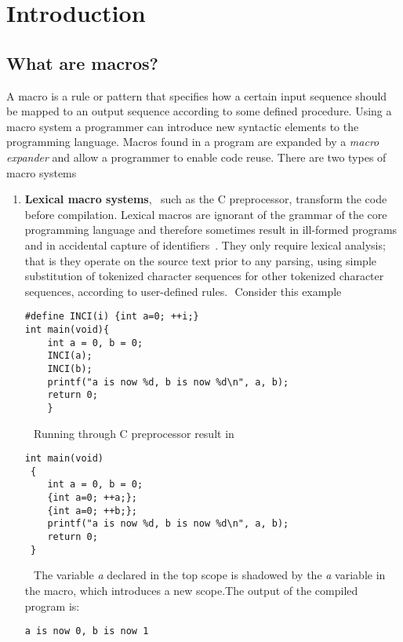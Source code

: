 \chapter{Introduction}

\section{What are macros?} 
A macro is a rule or pattern that specifies how a certain input sequence should be mapped to an output sequence according to some defined procedure. Using a macro system a programmer can introduce new syntactic elements to the programming language. Macros found in a program are expanded by a \textit{macro expander} and allow a programmer to enable code reuse.
There are two types of macro systems
\begin{enumerate}
\item {\bf Lexical macro systems},\textcolor{white}{``} such as the C preprocessor, transform the code before compilation. Lexical macros are ignorant of the grammar of the core programming language and therefore sometimes result in ill-formed programs and in accidental capture of identifiers~\cite{bib3}. They only require lexical analysis; that is they operate on the source text prior to any parsing, using simple substitution of tokenized character sequences for other tokenized character sequences, according to user-defined rules.\textcolor{white}{''} Consider this example 
\textcolor{white}{``}
\begin{lstlisting}[frame=single]
#define INCI(i) {int a=0; ++i;}
int main(void){	
 	int a = 0, b = 0;
 	INCI(a);
  	INCI(b);
  	printf("a is now %d, b is now %d\n", a, b);
  	return 0;
	}
\end{lstlisting}
\textcolor{white}{''}
Running through C preprocessor result in
\textcolor{white}{``}
\begin{lstlisting}[frame=single]
int main(void)
 {
    int a = 0, b = 0;
    {int a=0; ++a;};
    {int a=0; ++b;};
    printf("a is now %d, b is now %d\n", a, b);
    return 0;
 }
\end{lstlisting}
\textcolor{white}{''}
The variable {\it a} declared in the top scope is shadowed by the {\it a} variable in the macro, which introduces a new scope.The output of the compiled program is:

\begin{lstlisting}[frame=single]
a is now 0, b is now 1
\end{lstlisting}


\end{enumerate}
